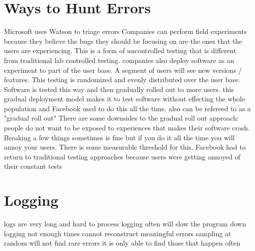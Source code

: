 \documentclass[twoside]{article}
\begin{document}
\section{Ways to Hunt Errors}
Microsoft uses Watson to triage errors
\newline
Companies can perform field experiments because they believe the bugs they should be focusing on are the ones that the users are experiencing. This is a form of uncontrolled testing that is different from traditional lab controlled testing. 
\newline
companies also deploy software as an experiment to part of the user base. A segment of users will see new versions / features. This testing is randomized and evenly distributed over the user base. Software is tested this way and then gradually rolled out to more users. 
\newline
this gradual deployment model makes it to test software without effecting the whole population and Facebook used to do this all the time.
\newline
also can be refereed to as a "gradual roll out"
\newline
There are some downsides to the gradual roll out approach:
\newline
people do not want to be exposed to experiences that makes their software crash. Breaking a few things sometimes is fine but if you do it all the time you will annoy your users. There is some measurable threshold for this.
\newline
Facebook had to return to traditional testing approaches because users were getting annoyed of their constant tests

\section{Logging}
logs are very long and hard to process
\newline
logging often will slow the program down 
\newline
logging not enough times cannot reconstruct meaningful errors
\newline
sampling at random will not find rare errors it is only able to find those that happen often
\end{document}

